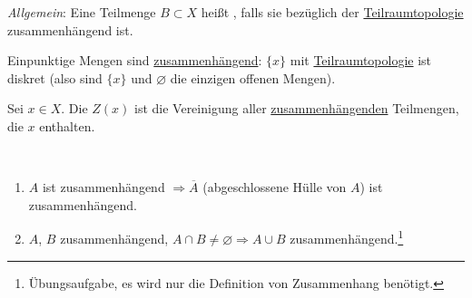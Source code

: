 \begin{remark}
  \emph{Allgemein}: Eine Teilmenge \( B \subset X \) heißt , falls sie bezüglich der \hyperref[def:teilraumtopologie]{Teilraumtopologie} zusammenhängend ist.
\end{remark}

\begin{remark}
  Einpunktige Mengen sind \hyperref[def:zusammenhaengend]{zusammenhängend}: \( \{ x \} \) mit \hyperref[def:teilraumtopologie]{Teilraumtopologie} ist diskret (also sind \( \{ x \} \) und \( \varnothing \) die einzigen offenen Mengen).
\end{remark}

\begin{definition}[Zusammenhangskomponente]\label{def:zusammenhangskomponente}
  Sei \( x \in X \). Die  \( Z(x) \) ist die Vereinigung aller \hyperref[def:zusammenhaengend]{zusammenhängenden} Teilmengen, die \( x \) enthalten.
\end{definition}

\begin{lemma}
  \
  \begin{enumerate}
    \item \( A \) ist zusammenhängend \( \Rightarrow \overline{A} \) (abgeschlossene Hülle von \( A \)) ist zusammenhängend.
    \item \( A \), \( B \) zusammenhängend, \( A \cap B \neq \varnothing \Rightarrow A \cup B \) zusammenhängend.\footnote{Übungsaufgabe, es wird nur die Definition von Zusammenhang benötigt.} 
  \end{enumerate}
\end{lemma}

